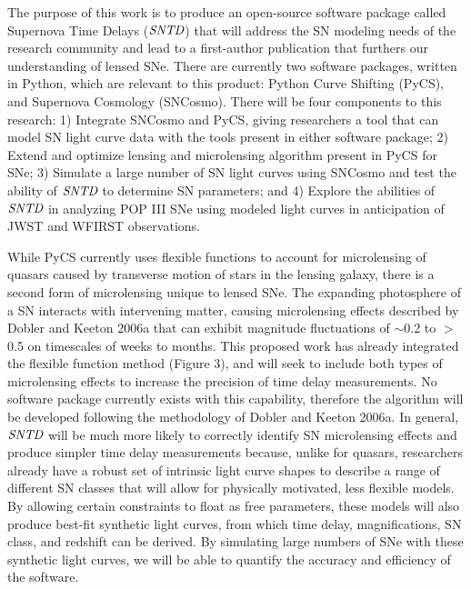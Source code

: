 The purpose of this work is to produce an open-source software package called Supernova Time Delays ($\textit{SNTD}$) that will address the SN modeling needs of the research community and lead to a first-author publication that furthers our understanding of lensed SNe. There are currently two software packages, written in Python, which are relevant to this product: Python Curve Shifting (PyCS), and Supernova Cosmology (SNCosmo). There will be four components to this research: 1) Integrate SNCosmo and PyCS, giving researchers a tool that can model SN light curve data with the tools present in either software package; 2) Extend and optimize lensing and microlensing algorithm present in PyCS for SNe; 3) Simulate a large number of SN light curves using SNCosmo and test the ability of $\textit{SNTD}$ to determine SN parameters; and 4) Explore the abilities of $\textit{SNTD}$ in analyzing POP III SNe using modeled light curves in anticipation of JWST and WFIRST observations. 

While PyCS currently uses flexible functions to account for microlensing of quasars caused by transverse motion of stars in the lensing galaxy, there is a second form of microlensing unique to lensed SNe. The expanding photosphere of a SN interacts with intervening matter, causing microlensing effects described by Dobler and Keeton 2006a that can exhibit magnitude fluctuations of $\sim$0.2 to $>$0.5 on timescales of weeks to months. This proposed work has already integrated the flexible function method (Figure 3), and will seek to include both types of microlensing effects to increase the precision of time delay measurements. No software package currently exists with this capability, therefore the algorithm will be developed following the methodology of Dobler and Keeton 2006a. In general, $\textit{SNTD}$ will be much more likely to correctly identify SN microlensing effects and produce simpler time delay measurements because, unlike for quasars, researchers already have a robust set of intrinsic light curve shapes to describe a range of different SN classes that will allow for physically motivated, less flexible models. By allowing certain constraints to float as free parameters, these models will also produce best-fit synthetic light curves, from which time delay, magnifications, SN class, and redshift can be derived. By simulating large numbers of SNe with these synthetic light curves, we will be able to quantify the accuracy and efficiency of the software.


